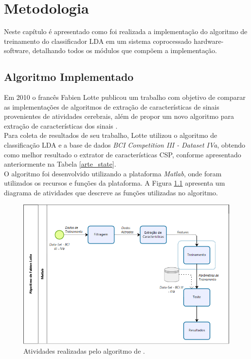 \chapter[Metodologia]{Metodologia}
Neste capítulo é apresentado como foi realizada a implementação do algoritmo de treinamento do classificador LDA em um sistema coprocessado hardware-software, detalhando todos os módulos que compõem a implementação.

\section{Algoritmo Implementado}
Em 2010 o francês Fabien Lotte publicou um trabalho com objetivo de comparar as implementações de algoritmos de extração de características de sinais provenientes de atividades cerebrais, além de propor um novo algoritmo para extração de características dos sinais \cite{F.Lotte}.\\
Para coleta de resultados de seu trabalho, Lotte utilizou o algoritmo de classificação LDA e a base de dados \textit{BCI Competition III - Dataset IVa}, obtendo como melhor resultado o extrator de características CSP, conforme apresentado anteriormente na Tabela \ref{arte_state}.\\
O algoritmo foi desenvolvido utilizando a plataforma \textit{Matlab}, onde foram utilizados os recursos e funções da plataforma. A Figura \ref{processos_alg} apresenta um diagrama de atividades que descreve as funções utilizadas no algoritmo.

\begin{figure}[h]
	\centering
	\includegraphics[keepaspectratio=true,scale=0.6]{figuras/Processos_Algoritmo_Lotte.PNG}
	\caption{Atividades realizadas pelo algoritmo de \cite{F.Lotte}.}
	\label{processos_alg}
\end{figure}

